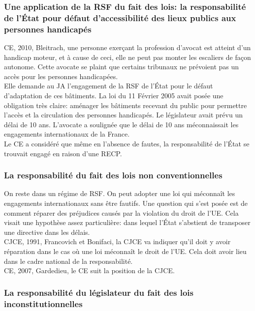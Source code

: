 \documentclass[10pt, a4paper, openany]{book}
\begin{document}
\subsubsection{Une application de la RSF du fait des lois: la responsabilité de l'État pour défaut d'accessibilité des lieux publics aux personnes handicapés}

CE, 2010, Bleitrach, une personne exerçant la profession d'avocat est atteint d'un handicap moteur, et à cause de ceci, elle ne peut pas monter les escaliers de façon autonome. Cette avocate se plaint que certains tribunaux ne prévoient pas un accès pour les personnes handicapées. \\
Elle demande au JA l'engagement de la RSF de l'État pour le défaut d'adaptation de ces bâtiments. La loi du 11 Février 2005 avait posée une obligation très claire: aménager les bâtiments recevant du public pour permettre l'accès et la circulation des personnes handicapés. Le législateur avait prévu un délai de 10 ans. L'avocate a soulignée que le délai de 10 ans méconnaissait les engagements internationaux de la France. \\
Le CE a considéré que même en l'absence de fautes, la responsabilité de l'État se trouvait engagé en raison d'une RECP. 

\subsubsection{La responsabilité du fait des lois non conventionnelles}

On reste dans un régime de RSF. On peut adopter une loi qui méconnaît les engagements internationaux sans être fautifs. Une question qui s'est posée est de comment réparer des préjudices causés par la violation du droit de l'UE. Cela visait une hypothèse assez particulière: dans lequel l'État s'abstient de transposer une directive dans les délais. \\
CJCE, 1991, Francovich et Bonifaci, la CJCE va indiquer qu'il doit y avoir réparation dans le cas où une loi méconnaît le droit de l'UE. Cela doit avoir lieu dans le cadre national de la responsabilité. \\
CE, 2007, Gardedieu, le CE suit la position de la CJCE. 

\subsubsection{La responsabilité du législateur du fait des lois inconstitutionnelles}
\end{document}

